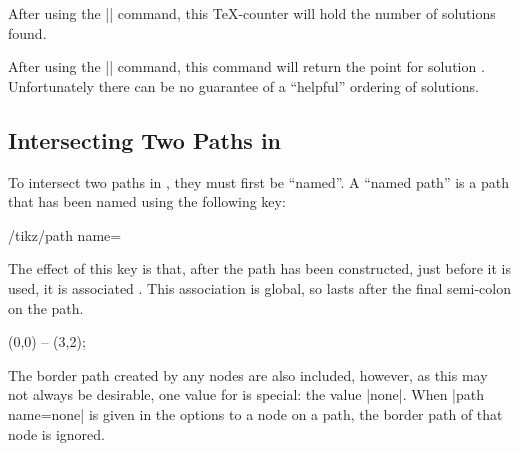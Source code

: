 \begin{command}{\pgfintersectionsolutions}
  After using the |\pgfintersectionofpaths| command, this \TeX-counter
  will hold the number of solutions found.
\end{command}

\begin{command}{\pgfpointintersectionsolution{}}
  After using the |\pgfintersectionofpaths| command, this command
  will return the point for solution . Unfortunately
  there can be no guarantee of a ``helpful'' ordering of solutions.
\end{command}

\subsection{Intersecting Two Paths in \tikzname}

  To intersect two paths in \tikzname, they must first be
  ``named''. A ``named path'' is a path that has been named using 
  the following key:
  
\begin{key}{/tikz/path name=}

	The effect of this key is that, after the path has been constructed,
  just before it is used, it is associated . This 
  association is global, so lasts after the final semi-colon on the
  path.
  
\begin{codeexample}
\draw [path name=straight line] (0,0) -- (3,2);
\end{codeexample}

  The border path created by any nodes are also included, however,
  as this may not always be desirable, one value for  
  is special: the value |none|. When |path name=none| is given 
  in the options to a node on a path, the border path of that node is 
  ignored. 

\begin{codeexample}[]
\end{codeexample}
\end{key}


